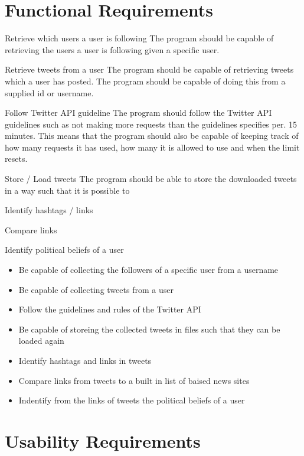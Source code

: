 \section{Functional Requirements}

\begin{requirement}{Retrieve which users a user is following}
The program should be capable of retrieving the users a user is
following given a specific user.
\end{requirement}

\begin{requirement}{Retrieve tweets from a user}
The program should be capable of retrieving tweets which a user has posted. The
program should be capable of doing this from a supplied id or username.
\end{requirement}

\begin{requirement}{Follow Twitter \ac{API} guideline}
The program should follow the Twitter \ac{API} guidelines such as not making
more requests than the guidelines specifies per. 15 minutes. This means that the
program should also be capable of keeping track of how many requests it has
used, how many it is allowed to use and when the limit resets.
\end{requirement}

\begin{requirement}{Store / Load tweets}
The program should be able to store the downloaded tweets in a way such that it
is possible to 
\end{requirement}

\begin{requirement}{Identify hashtags / links}

\end{requirement}

\begin{requirement}{Compare links}

\end{requirement}

\begin{requirement}{Identify political beliefs of a user }

\end{requirement}
\begin{itemize}
 \item Be capable of collecting the followers of a specific user from a username
 \item Be capable of collecting tweets from a user
 \item Follow the guidelines and rules of the Twitter API
 \item Be capable of storeing the collected tweets in files such that they can
 be loaded again
 \item Identify hashtags and links in tweets
 \item Compare links from tweets to a built in list of baised news sites
 \item Indentify from the links of tweets the political beliefs of a user
\end{itemize}

\section{Usability Requirements}
